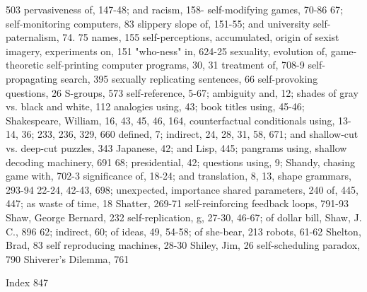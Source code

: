  503                                                  pervasiveness of, 147-48; and racism, 158-
self-modifying games, 70-86                           67;
self-monitoring computers, 83                        slippery slope of, 151-55; and university
self-paternalism, 74. 75                              names, 155
self-perceptions, accumulated, origin of             sexist imagery, experiments on, 151
"who-ness" in, 624-25                                sexuality, evolution of, game-theoretic
self-printing computer programs, 30, 31               treatment of, 708-9
self-propagating search, 395                         sexually replicating sentences, 66
self-provoking questions, 26                         S-groups, 573
self-reference, 5-67; ambiguity and, 12;             shades of gray vs. black and white, 112
 analogies using, 43; book titles using, 45-46;      Shakespeare, William, 16, 43, 45, 46, 164,
 counterfactual conditionals using, 13-14, 36;        233, 236, 329, 660
 defined, 7; indirect, 24, 28, 31, 58, 671; and      shallow-cut vs. deep-cut puzzles, 343
 Japanese, 42; and Lisp, 445; pangrams using,        shallow decoding machinery, 691
 68; presidential, 42; questions using, 9;           Shandy, chasing game with, 702-3
 significance of, 18-24; and translation, 8, 13,     shape grammars, 293-94
 22-24, 42-43, 698; unexpected, importance           shared parameters, 240
 of, 445, 447; as waste of time, 18                  Shatter, 269-71
self-reinforcing feedback loops, 791-93              Shaw, George Bernard, 232
self-replication, g, 27-30, 46-67; of dollar bill,   Shaw, J. C., 896
 62; indirect, 60; of ideas, 49, 54-58; of           she-bear, 213
 robots, 61-62                                       Shelton, Brad, 83
self reproducing machines, 28-30                     Shiley, Jim, 26
self-scheduling paradox, 790                         Shiverer's Dilemma, 761

 Index                                                                                         847

